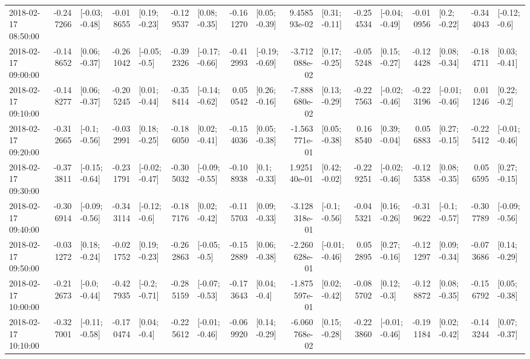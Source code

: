\begin{tabular}{lrlrlrlrlrlrlrlrl}
2018-02-17 08:50:00 & -0.247266 &  [-0.03; -0.48] & -0.018655 &   [0.19; -0.23] & -0.129537 &   [0.08; -0.35] & -0.161270 &   [0.05; -0.39] &  9.458593e-02 &   [0.31; -0.11] & -0.254534 &  [-0.04; -0.49] & -0.010956 &    [0.2; -0.22] & -0.344043 &   [-0.12; -0.6] \\
2018-02-17 09:00:00 & -0.148652 &   [0.06; -0.37] & -0.261042 &   [-0.05; -0.5] & -0.392326 &  [-0.17; -0.66] & -0.412993 &  [-0.19; -0.69] & -3.712088e-02 &   [0.17; -0.25] & -0.055248 &   [0.15; -0.27] & -0.124428 &   [0.08; -0.34] & -0.184711 &   [0.03; -0.41] \\
2018-02-17 09:10:00 & -0.148277 &   [0.06; -0.37] & -0.205245 &   [0.01; -0.44] & -0.358414 &  [-0.14; -0.62] &  0.050542 &   [0.26; -0.16] & -7.888680e-02 &   [0.13; -0.29] & -0.227563 &  [-0.02; -0.46] & -0.223196 &  [-0.01; -0.46] &  0.011246 &    [0.22; -0.2] \\
2018-02-17 09:20:00 & -0.312665 &   [-0.1; -0.56] & -0.032991 &   [0.18; -0.25] & -0.186050 &   [0.02; -0.41] & -0.154036 &   [0.05; -0.38] & -1.563771e-01 &   [0.05; -0.38] &  0.168540 &   [0.39; -0.04] &  0.056883 &   [0.27; -0.15] & -0.225412 &  [-0.01; -0.46] \\
2018-02-17 09:30:00 & -0.373811 &  [-0.15; -0.64] & -0.231791 &  [-0.02; -0.47] & -0.305032 &  [-0.09; -0.55] & -0.108938 &    [0.1; -0.33] &  1.925140e-01 &   [0.42; -0.02] & -0.229251 &  [-0.02; -0.46] & -0.125358 &   [0.08; -0.35] &  0.056595 &   [0.27; -0.15] \\
2018-02-17 09:40:00 & -0.306914 &  [-0.09; -0.56] & -0.343114 &   [-0.12; -0.6] & -0.187176 &   [0.02; -0.42] & -0.115703 &   [0.09; -0.33] & -3.128318e-01 &   [-0.1; -0.56] & -0.045321 &   [0.16; -0.26] & -0.319622 &   [-0.1; -0.57] & -0.307789 &  [-0.09; -0.56] \\
2018-02-17 09:50:00 & -0.031272 &   [0.18; -0.24] & -0.021752 &   [0.19; -0.23] & -0.262863 &   [-0.05; -0.5] & -0.152889 &   [0.06; -0.38] & -2.260628e-01 &  [-0.01; -0.46] &  0.052895 &   [0.27; -0.16] & -0.121297 &   [0.09; -0.34] & -0.073686 &   [0.14; -0.29] \\
2018-02-17 10:00:00 & -0.212673 &   [-0.0; -0.44] & -0.427935 &   [-0.2; -0.71] & -0.285159 &  [-0.07; -0.53] & -0.173643 &    [0.04; -0.4] & -1.875597e-01 &   [0.02; -0.42] & -0.085702 &    [0.12; -0.3] & -0.128872 &   [0.08; -0.35] & -0.156792 &   [0.05; -0.38] \\
2018-02-17 10:10:00 & -0.327001 &  [-0.11; -0.58] & -0.170474 &    [0.04; -0.4] & -0.225612 &  [-0.01; -0.46] & -0.069920 &   [0.14; -0.29] & -6.060768e-02 &   [0.15; -0.28] & -0.223860 &  [-0.01; -0.46] & -0.191184 &   [0.02; -0.42] & -0.143244 &   [0.07; -0.37] \\

\end{tabular}
